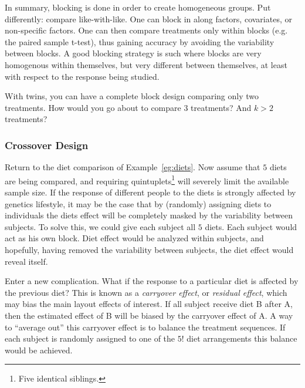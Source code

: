 In summary, blocking is done in order to create homogeneous groups. 
Put differently: compare like-with-like. 
One can block in along factors, covariates, or non-specific factors. 
One can then compare treatments only within blocks (e.g. the paired sample t-test), thus gaining accuracy by avoiding the variability between blocks. 
A good blocking strategy is such where blocks are very homogenous within themselves, but very different between themselves, at least with respect to the response being studied. 


\begin{think}
With twins, you can have a complete block design comparing only two treatments. 
How would you go about to compare $3$ treatments?
And $k>2$ treatments?
\end{think}






\subsubsection{Crossover Design}
\label{sec:crossover}

Return to the diet comparison of Example~\ref{eg:diets}. 
Now assume that $5$ diets are being compared, and requiring quintuplets\footnote{Five identical siblings.} will severely limit the available sample size. 
If the response of different people to the diets is strongly affected by genetics \andor lifestyle, it may be the case that by (randomly) assigning diets to individuals the diets effect will be completely masked by the variability between subjects. 
To solve this, we could give each subject all $5$ diets. 
Each subject would act as his own block.
Diet effect would be analyzed within subjects, and hopefully, having removed the variability between subjects, the diet effect would reveal itself. 

Enter a new complication. 
What if the response to a particular diet is affected by the previous diet?
This is known as a \emph{carryover effect}, or \emph{residual effect}, which may bias the main layout effects of interest. 
If all subject receive diet B after A, then the estimated effect of B will be biased by the carryover effect of A. 
A way to ``average out'' this carryover effect is to balance the treatment sequences. 
If each subject is randomly assigned to one of the $5!$ diet arrangements this balance would be achieved.

